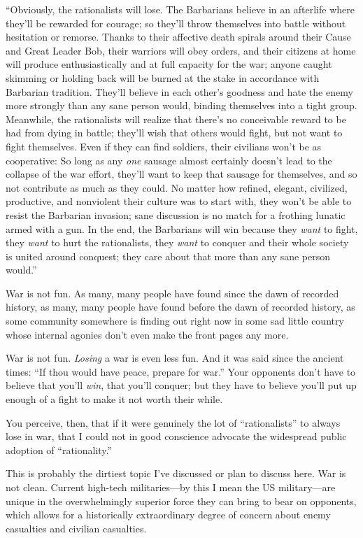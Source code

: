 {
 ``Obviously, the rationalists will lose. The
Barbarians believe in an afterlife where they'll be
rewarded for courage; so they'll throw themselves into
battle without hesitation or remorse. Thanks to their affective death
spirals around their Cause and Great Leader Bob, their warriors will
obey orders, and their citizens at home will produce enthusiastically
and at full capacity for the war; anyone caught skimming or holding
back will be burned at the stake in accordance with Barbarian
tradition. They'll believe in each
other's goodness and hate the enemy more strongly than
any sane person would, binding themselves into a tight group.
Meanwhile, the rationalists will realize that there's
no conceivable reward to be had from dying in battle;
they'll wish that others would fight, but not want to
fight themselves. Even if they can find soldiers, their civilians
won't be as cooperative: So long as any \textit{one}
sausage almost certainly doesn't lead to the collapse
of the war effort, they'll want to keep that sausage
for themselves, and so not contribute as much as they could. No matter
how refined, elegant, civilized, productive, and nonviolent their
culture was to start with, they won't be able to resist
the Barbarian invasion; sane discussion is no match for a frothing
lunatic armed with a gun. In the end, the Barbarians will win because
they \textit{want} to fight, they \textit{want} to hurt the
rationalists, they \textit{want} to conquer and their whole society is
united around conquest; they care about that more than any sane person
would.''}

{
 War is not fun. As many, many people have found since the dawn of
recorded history, as many, many people have found before the dawn of
recorded history, as some community somewhere is finding out right now
in some sad little country whose internal agonies don't
even make the front pages any more.}

{
 War is not fun. \textit{Losing} a war is even less fun. And it was
said since the ancient times: ``If thou would have
peace, prepare for war.'' Your opponents
don't have to believe that you'll
\textit{win}, that you'll conquer; but they have to
believe you'll put up enough of a fight to make it not
worth their while.}

{
 You perceive, then, that if it were genuinely the lot of
``rationalists'' to always lose in
war, that I could not in good conscience advocate the widespread public
adoption of ``rationality.''}

{
 This is probably the dirtiest topic I've discussed
or plan to discuss here. War is not clean. Current high-tech
militaries---by this I mean the US military---are unique in the
overwhelmingly superior force they can bring to bear on opponents,
which allows for a historically extraordinary degree of concern about
enemy casualties and civilian casualties.}

